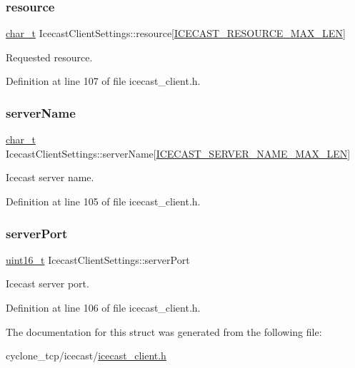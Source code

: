 \subsubsection{\texorpdfstring{resource}{resource}}
{\footnotesize\ttfamily \hyperlink{compiler__port_8h_a40bb5262bf908c328fbcfbe5d29d0201}{char\+\_\+t} Icecast\+Client\+Settings\+::resource\mbox{[}\hyperlink{icecast__client_8h_ad4b3bc69341a6ccaa4b498ad73415d1f}{I\+C\+E\+C\+A\+S\+T\+\_\+\+R\+E\+S\+O\+U\+R\+C\+E\+\_\+\+M\+A\+X\+\_\+\+L\+EN}\mbox{]}}



Requested resource. 



Definition at line 107 of file icecast\+\_\+client.\+h.

\mbox{\label{structIcecastClientSettings_a03d74c882d8ab90fe1f1efd160836b34}} 
\subsubsection{\texorpdfstring{server\+Name}{serverName}}
{\footnotesize\ttfamily \hyperlink{compiler__port_8h_a40bb5262bf908c328fbcfbe5d29d0201}{char\+\_\+t} Icecast\+Client\+Settings\+::server\+Name\mbox{[}\hyperlink{icecast__client_8h_a9a553028f9619cec3c7a73ab5900625c}{I\+C\+E\+C\+A\+S\+T\+\_\+\+S\+E\+R\+V\+E\+R\+\_\+\+N\+A\+M\+E\+\_\+\+M\+A\+X\+\_\+\+L\+EN}\mbox{]}}



Icecast server name. 



Definition at line 105 of file icecast\+\_\+client.\+h.

\mbox{\label{structIcecastClientSettings_a882d219c88d29905c69a4cde1796a913}} 
\subsubsection{\texorpdfstring{server\+Port}{serverPort}}
{\footnotesize\ttfamily \hyperlink{stdint_8h_a273cf69d639a59973b6019625df33e30}{uint16\+\_\+t} Icecast\+Client\+Settings\+::server\+Port}



Icecast server port. 



Definition at line 106 of file icecast\+\_\+client.\+h.



The documentation for this struct was generated from the following file\+:\begin{DoxyCompactItemize}
\item 
cyclone\+\_\+tcp/icecast/\hyperlink{icecast__client_8h}{icecast\+\_\+client.\+h}\end{DoxyCompactItemize}
